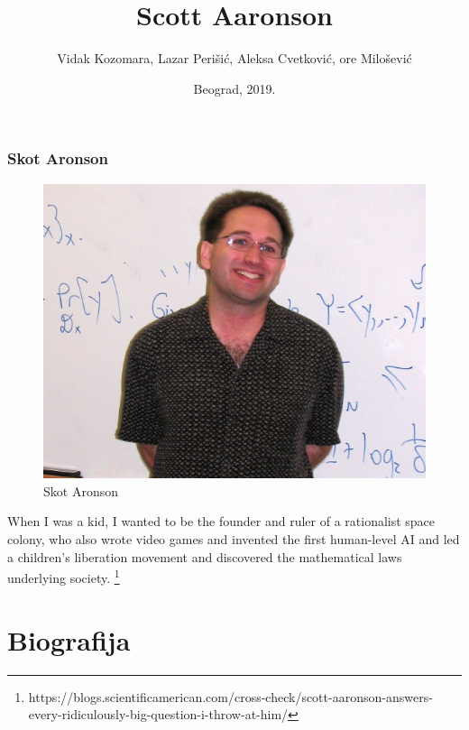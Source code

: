 \documentclass{beamer}
\def\dJ{{\fontencoding{T1}\selectfont\dj}}
\def\Dj{{\fontencoding{T1}\selectfont\DJ}}
\begin{document}
\title{Scott Aaronson}
\author[]{Vidak Kozomara, Lazar Perišić, Aleksa Cvetković, \newline \Dj{}or\dJ{}e Milošević}
\date{
	\footnotesize{Beograd, 2019.}	
}

\begin{frame}
	\thispagestyle{empty}
	\titlepage
\end{frame}

\addtocounter{framenumber}{-1}
\begin{frame}[fragile]\frametitle{Skot Aronson}
	\begin{figure}
		\includegraphics[scale=0.2]{Scott Aaronson.jpg}
		\caption{Skot Aronson}
		\end{figure}
	\begin{displayquote}
		When I was a kid, I wanted to be the founder and ruler of a rationalist space colony, who also wrote video games and invented the first human-level AI and led a children’s liberation movement and discovered the mathematical laws underlying society.
		\footnote{https://blogs.scientificamerican.com/cross-check/scott-aaronson-answers-every-ridiculously-big-question-i-throw-at-him/}
		\end{displayquote}

\end{frame}

\section{Biografija}
\end{document}
